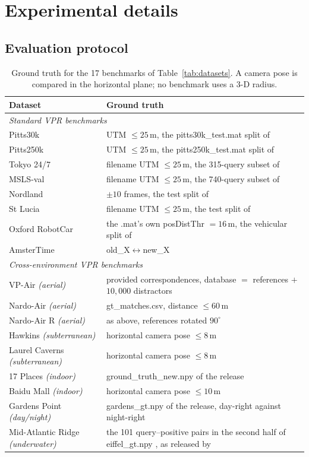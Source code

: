 \section{Experimental details}
\subsection{Evaluation protocol}
\label{app:protocol}
\begin{table}[H]
\caption{Ground truth for the 17 benchmarks of Table~\ref{tab:datasets}. A camera pose is compared in the horizontal plane; no benchmark uses a 3-D radius.}
\label{tab:protocol}
\centering
{\footnotesize\setlength{\tabcolsep}{4pt}%
\begin{tabular}{@{}l p{}@{}}
\toprule
Dataset & Ground truth \\
\midrule
\multicolumn{2}{l}{\emph{Standard VPR benchmarks}} \\
\midrule
Pitts30k & UTM $\le 25$\,m, the pitts30k\_test.mat split of \citet{netvlad} \\
Pitts250k & UTM $\le 25$\,m, the pitts250k\_test.mat split of \citet{netvlad} \\
Tokyo 24/7 & filename UTM $\le 25$\,m, the 315-query subset of \citet{netvlad} \\
MSLS-val & filename UTM $\le 25$\,m, the 740-query subset of \citet{patchnetvlad} \\
Nordland & $\pm 10$ frames, the test split of \citet{vgbench} \\
St Lucia & filename UTM $\le 25$\,m, the test split of \citet{vgbench} \\
Oxford RobotCar & the .mat's own posDistThr $=16$\,m, the vehicular split of \citet{anyloc} \\
AmsterTime & old\_X$\leftrightarrow$new\_X \\
\midrule
\multicolumn{2}{l}{\emph{Cross-environment VPR benchmarks}} \\
\midrule
VP-Air \emph{(aerial)} & provided correspondences, database $=$ references $+$ $10{,}000$ distractors \\
Nardo-Air \emph{(aerial)} & gt\_matches.csv, distance $\le 60$\,m \\
Nardo-Air R \emph{(aerial)} & as above, references rotated $90^\circ$ \\
Hawkins \emph{(subterranean)} & horizontal camera pose $\le 8$\,m \\
Laurel Caverns \emph{(subterranean)} & horizontal camera pose $\le 8$\,m \\
17 Places \emph{(indoor)} & ground\_truth\_new.npy of the \citet{anyloc} release \\
Baidu Mall \emph{(indoor)} & horizontal camera pose $\le 10$\,m \\
Gardens Point \emph{(day/night)} & gardens\_gt.npy of the \citet{anyloc} release, day-right against night-right \\
Mid-Atlantic Ridge \emph{(underwater)} & the 101 query--positive pairs in the second half of eiffel\_gt.npy \citep{eiffeltower}, as released by \citet{anyloc} \\
\bottomrule
\end{tabular}%
}

\end{table}

